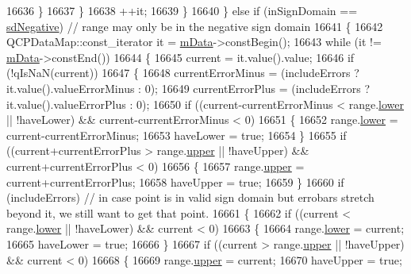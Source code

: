 \begin{DoxyCode}
16636         \}
16637       \}
16638       ++it;
16639     \}
16640   \} \textcolor{keywordflow}{else} \textcolor{keywordflow}{if} (inSignDomain == \hyperlink{class_q_c_p_abstract_plottable_a661743478a1d3c09d28ec2711d7653d8a0fc9a70796ef60ad18ddd18056e6dc63}{sdNegative}) \textcolor{comment}{// range may only be in the negative sign domain}
16641   \{
16642     QCPDataMap::const\_iterator it = \hyperlink{class_q_c_p_graph_a8457c840f69a0ac49f61d30a509c5d08}{mData}->constBegin();
16643     \textcolor{keywordflow}{while} (it != \hyperlink{class_q_c_p_graph_a8457c840f69a0ac49f61d30a509c5d08}{mData}->constEnd())
16644     \{
16645       current = it.value().value;
16646       \textcolor{keywordflow}{if} (!qIsNaN(current))
16647       \{
16648         currentErrorMinus = (includeErrors ? it.value().valueErrorMinus : 0);
16649         currentErrorPlus = (includeErrors ? it.value().valueErrorPlus : 0);
16650         \textcolor{keywordflow}{if} ((current-currentErrorMinus < range.\hyperlink{class_q_c_p_range_aa3aca3edb14f7ca0c85d912647b91745}{lower} || !haveLower) && current-currentErrorMinus < 0)
16651         \{
16652           range.\hyperlink{class_q_c_p_range_aa3aca3edb14f7ca0c85d912647b91745}{lower} = current-currentErrorMinus;
16653           haveLower = \textcolor{keyword}{true};
16654         \}
16655         \textcolor{keywordflow}{if} ((current+currentErrorPlus > range.\hyperlink{class_q_c_p_range_ae44eb3aafe1d0e2ed34b499b6d2e074f}{upper} || !haveUpper) && current+currentErrorPlus < 0)
16656         \{
16657           range.\hyperlink{class_q_c_p_range_ae44eb3aafe1d0e2ed34b499b6d2e074f}{upper} = current+currentErrorPlus;
16658           haveUpper = \textcolor{keyword}{true};
16659         \}
16660         \textcolor{keywordflow}{if} (includeErrors) \textcolor{comment}{// in case point is in valid sign domain but errobars stretch beyond it, we
       still want to get that point.}
16661         \{
16662           \textcolor{keywordflow}{if} ((current < range.\hyperlink{class_q_c_p_range_aa3aca3edb14f7ca0c85d912647b91745}{lower} || !haveLower) && current < 0)
16663           \{
16664             range.\hyperlink{class_q_c_p_range_aa3aca3edb14f7ca0c85d912647b91745}{lower} = current;
16665             haveLower = \textcolor{keyword}{true};
16666           \}
16667           \textcolor{keywordflow}{if} ((current > range.\hyperlink{class_q_c_p_range_ae44eb3aafe1d0e2ed34b499b6d2e074f}{upper} || !haveUpper) && current < 0)
16668           \{
16669             range.\hyperlink{class_q_c_p_range_ae44eb3aafe1d0e2ed34b499b6d2e074f}{upper} = current;
16670             haveUpper = \textcolor{keyword}{true};

\end{DoxyCode}
